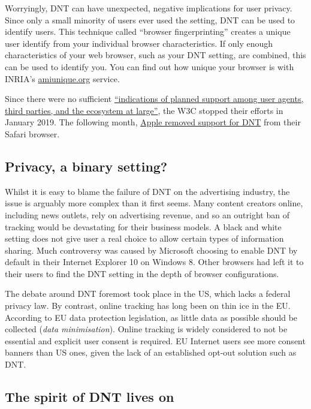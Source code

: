 \documentclass[
]{book}
\begin{document}
Worryingly, DNT can have unexpected, negative implications for user privacy. Since only a small minority of users ever used the setting, DNT can be used to identify users. This technique called ``browser fingerprinting'' creates a unique user identify from your individual browser characteristics. If only enough characteristics of your web browser, such as your DNT setting, are combined, this can be used to identify you. You can find out how unique your browser is with INRIA's \href{https://amiunique.org/}{amiunique.org} service.

Since there were no sufficient \href{https://github.com/w3c/dnt/commit/5d85d6c3d116b5eb29fddc69352a77d87dfd2310}{``indications of planned support among user agents, third parties, and the ecosystem at large''}, the W3C stopped their efforts in January 2019. The following month, \href{https://www.fastcompany.com/90308068/how-the-tragic-death-of-do-not-track-ruined-the-web-for-everyone}{Apple removed support for DNT} from their Safari browser.

\hypertarget{privacy-a-binary-setting}{%
\subsection{Privacy, a binary setting?}\label{privacy-a-binary-setting}}

Whilst it is easy to blame the failure of DNT on the advertising industry, the issue is arguably more complex than it first seems. Many content creators online, including news outlets, rely on advertising revenue, and so an outright ban of tracking would be devastating for their business models. A black and white setting does not give user a real choice to allow certain types of information sharing. Much controversy was caused by Microsoft choosing to enable DNT by default in their Internet Explorer 10 on Windows 8. Other browsers had left it to their users to find the DNT setting in the depth of browser configurations.

The debate around DNT foremost took place in the US, which lacks a federal privacy law. By contrast, online tracking has long been on thin ice in the EU. According to EU data protection legislation, as little data as possible should be collected (\emph{data minimisation}). Online tracking is widely considered to not be essential and explicit user consent is required. EU Internet users see more consent banners than US ones, given the lack of an established opt-out solution such as DNT.

\hypertarget{the-spirit-of-dnt-lives-on}{%
\subsection{The spirit of DNT lives on}\label{the-spirit-of-dnt-lives-on}}
\end{document}
